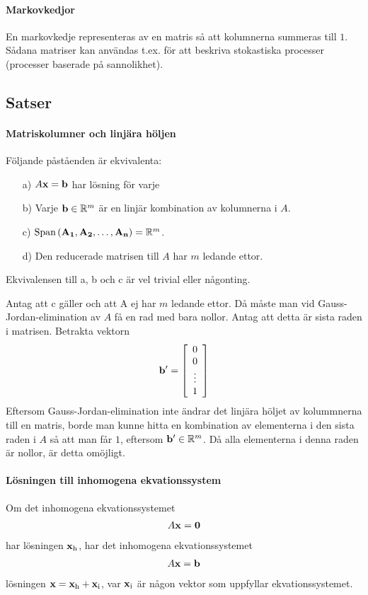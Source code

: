 \paragraph{Markovkedjor}
En markovkedje representeras av en matris så att kolumnerna summeras till $1$. Sådana matriser kan användas t.ex. för att beskriva stokastiska processer (processer baserade på sannolikhet).

\subsection{Satser}

\paragraph{Matriskolumner och linjära höljen}
Följande påståenden är ekvivalenta:
\begin{itemize}
	\item[a)] $A\vectorbold{x} = \vect{b}$ har lösning för varje
	\item[b)] Varje $\vect{b}\in \R^{m}$ är en linjär kombination av kolumnerna i $A$.
	\item[c)] $\Span{\vect{A_1}, \vect{A_2}, \dots, \vect{A_n}} = \R^m$.
	\item[d)] Den reducerade matrisen till $A$ har $m$ ledande ettor.
\end{itemize}

\proof
Ekvivalensen till a, b och c är vel trivial eller någonting.

Antag att c gäller och att A ej har $m$ ledande ettor. Då måste man vid Gauss-Jordan-elimination av $A$ få en rad med bara nollor. Antag att detta är sista raden i matrisen. Betrakta vektorn
\begin{align*}
	\vect{b}' =
	\left[\begin{array}{c}
    	0    \\
    	0    \\
    	\vdots \\
	    1
	\end{array}\right]
\end{align*}
Eftersom Gauss-Jordan-elimination inte ändrar det linjära höljet av kolummnerna till en matris, borde man kunne hitta en kombination av elementerna i den sista raden i $A$ så att man får $1$, eftersom $\vect{b}'\in\R^m$. Då alla elementerna i denna raden är nollor, är detta omöjligt.

\paragraph{Lösningen till inhomogena ekvationssystem}
Om det inhomogena ekvationssystemet
\begin{align*}
	A\vect{x} = \vect{0}
\end{align*}
har lösningen $\vect{x}_\text{h}$, har det inhomogena ekvationssystemet
\begin{align*}
	A\vect{x} = \vect{b}
\end{align*}
lösningen $\vect{x} = \vect{x}_\text{h} + \vect{x}_\text{i}$, var $\vect{x}_\text{i}$ är någon vektor som uppfyllar ekvationssystemet.

